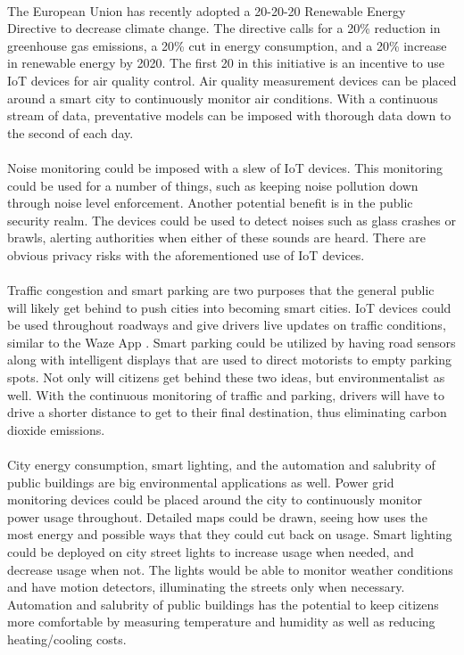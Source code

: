 \documentclass[a4paper,12pt]{article}
\begin{document}
\paragraph{}
The European Union has recently adopted a 20-20-20 Renewable Energy Directive to decrease climate change. The directive calls for a 20\% reduction in greenhouse gas emissions, a 20\% cut in energy consumption, and a 20\% increase in renewable energy by 2020. The first 20 in this initiative is an incentive to use IoT devices for air quality control. Air quality measurement devices can be placed around a smart city to continuously monitor air conditions. With a continuous stream of data, preventative models can be imposed with thorough data down to the second of each day. 
\paragraph{}
Noise monitoring could be imposed with a slew of IoT devices. This monitoring could be used for a number of things, such as keeping noise pollution down through noise level enforcement. Another potential benefit is in the public security realm. The devices could be used to detect noises such as glass crashes or brawls, alerting authorities when either of these sounds are heard. There are obvious privacy risks with the aforementioned use of IoT devices. 
\paragraph{}
Traffic congestion and smart parking are two purposes that the general public will likely get behind to push cities into becoming smart cities. IoT devices could be used throughout roadways and give drivers live updates on traffic conditions, similar to the Waze App \cite{waze}. Smart parking could be utilized by having road sensors along with intelligent displays that are used to direct motorists to empty parking spots. Not only will citizens get behind these two ideas, but environmentalist as well. With the continuous monitoring of traffic and parking, drivers will have to drive a shorter distance to get to their final destination, thus eliminating carbon dioxide emissions.
\paragraph{}
City energy consumption, smart lighting, and the automation and salubrity of public buildings are big environmental applications as well. Power grid monitoring devices could be placed around the city to continuously monitor power usage throughout. Detailed maps could be drawn, seeing how uses the most energy and possible ways that they could cut back on usage. Smart lighting could be deployed on city street lights to increase usage when needed, and decrease usage when not. The lights would be able to monitor weather conditions and have motion detectors, illuminating the streets only when necessary. Automation and salubrity of public buildings has the potential to keep citizens more comfortable by measuring temperature and humidity as well as reducing heating/cooling costs.
\end{document}
